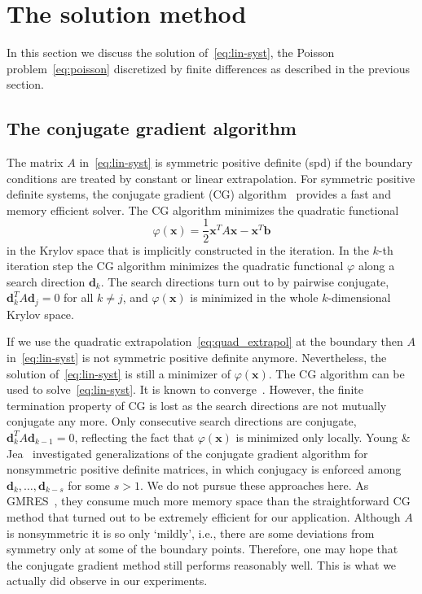 \section{The solution method}
\label{sec:method}

In this section we discuss the solution of~\eqref{eq:lin-syst}, the
Poisson problem~\eqref{eq:poisson} discretized by finite differences as
described in the previous section.

\subsection{The conjugate gradient algorithm}

The matrix $A$ in~\eqref{eq:lin-syst} is symmetric positive definite
(spd) if the boundary conditions are treated by constant or linear
extrapolation.  For symmetric positive definite systems, the conjugate
gradient (CG) algorithm~\cite{hack:94,hest:52} provides a fast and
memory efficient solver.  The CG algorithm minimizes the quadratic
functional
\begin{equation} \label{eq:cg-funct}
  \varphi(\mathbf{x}) = \frac{1}{2}\mathbf{x}^T A \mathbf{x} - \mathbf{x}^T
  \mathbf{b}
\end{equation}
in the Krylov space that is implicitly constructed in the iteration.  In
the $k$-th iteration step the CG algorithm minimizes the quadratic
functional $\varphi$ along a search direction $\mathbf{d}_k$.  The search
directions turn out to by pairwise conjugate, $\mathbf{d}_k^T A
\mathbf{d}_j = 0$ for all $k\neq j$, and $\varphi(\mathbf{x})$ is
minimized in the whole $k$-dimensional Krylov space.

If we use the quadratic extrapolation~\eqref{eq:quad_extrapol} at the
boundary then $A$ in~\eqref{eq:lin-syst} is not symmetric positive
definite anymore.  Nevertheless, the solution of~\eqref{eq:lin-syst} is
still a minimizer of $\varphi(\mathbf{x})$.  The CG algorithm can be
used to solve~\eqref{eq:lin-syst}.  It is known to
converge~\cite{gree:97}.  However, the finite termination property of CG
is lost as the search directions are not mutually conjugate any more.
Only consecutive search directions are conjugate, $\mathbf{d}_k^T A
\mathbf{d}_{k-1} = 0$, reflecting the fact that $\varphi(\mathbf{x})$ is
minimized only locally.
Young \& Jea~\cite{yoje:80} investigated generalizations of the
conjugate gradient algorithm for nonsymmetric positive definite
matrices, in which conjugacy is enforced among $\mathbf{d}_k, \ldots,
\mathbf{d}_{k-s}$ for some $s>1$.  We do not pursue these approaches
here.  As GMRES~\cite{sasc:86}, they consume much more memory space than
the straightforward CG method that turned out to be extremely efficient
for our application.  Although $A$ is nonsymmetric it is so only
`mildly', i.e., there are some deviations from symmetry only at some of
the boundary points.  Therefore, one may hope that the conjugate
gradient method still performs reasonably well.  This is what we
actually did observe in our experiments.

